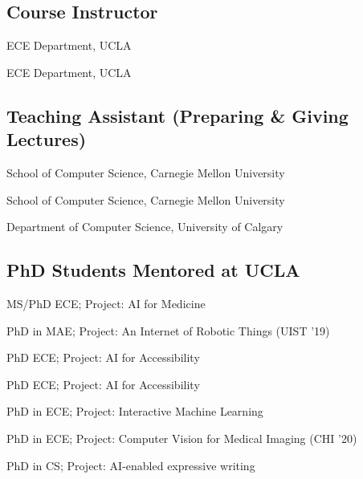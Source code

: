 \subsection{Course Instructor}

 {
	 {
		ECE Department, UCLA
	}
}

 {
	 {
		ECE Department, UCLA
	}
}

\subsection{Teaching Assistant (Preparing \& Giving Lectures)}

 {
	 {
		School of Computer Science, Carnegie Mellon University
	}
}

 {
	 {
		School of Computer Science, Carnegie Mellon University
	}
}

 {
	 {
		Department of Computer Science, University of Calgary
	}
}

\subsection{PhD Students Mentored at UCLA}

 {
	 {
		MS/PhD ECE; Project: AI for Medicine
	}
}

 {
	 {
		PhD in MAE; Project: An Internet of Robotic Things (UIST '19)
	}
}

 {
	 {
		PhD ECE; Project: AI for Accessibility	}
}

 {
	 {
		PhD ECE; Project: AI for Accessibility	}
}

 {
	 {
		PhD in ECE; Project: Interactive Machine Learning
	}
}

 {
	 {
		PhD in ECE; Project: Computer Vision for Medical Imaging (CHI '20)	
	}
}

 {
	 {
		PhD in CS; Project: AI-enabled expressive writing	
	}
}

